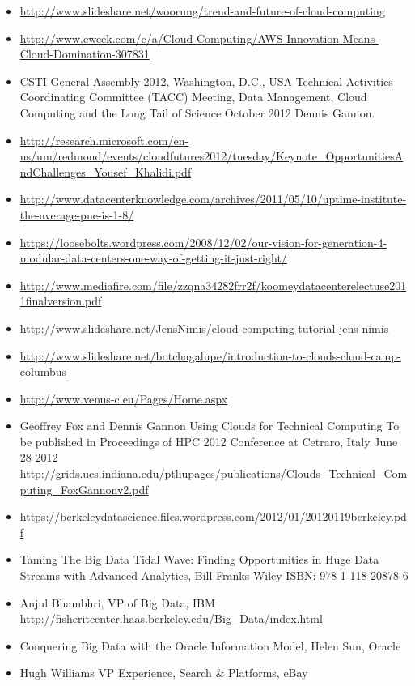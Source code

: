 \begin{itemize}
\tightlist
\item
  \url{http://www.slideshare.net/woorung/trend-and-future-of-cloud-computing}
\item
  \url{http://www.eweek.com/c/a/Cloud-Computing/AWS-Innovation-Means-Cloud-Domination-307831}
\item
  CSTI General Assembly 2012, Washington, D.C., USA Technical Activities
  Coordinating Committee (TACC) Meeting, Data Management, Cloud
  Computing and the Long Tail of Science October 2012 Dennis Gannon.
\item
  \url{http://research.microsoft.com/en-us/um/redmond/events/cloudfutures2012/tuesday/Keynote_OpportunitiesAndChallenges_Yousef_Khalidi.pdf}
\item
  \url{http://www.datacenterknowledge.com/archives/2011/05/10/uptime-institute-the-average-pue-is-1-8/}
\item
  \url{https://loosebolts.wordpress.com/2008/12/02/our-vision-for-generation-4-modular-data-centers-one-way-of-getting-it-just-right/}
\item
  \url{http://www.mediafire.com/file/zzqna34282frr2f/koomeydatacenterelectuse2011finalversion.pdf}
\item
  \url{http://www.slideshare.net/JensNimis/cloud-computing-tutorial-jens-nimis}
\item
  \url{http://www.slideshare.net/botchagalupe/introduction-to-clouds-cloud-camp-columbus}
\item
  \url{http://www.venus-c.eu/Pages/Home.aspx}
\item
  Geoffrey Fox and Dennis Gannon Using Clouds for Technical Computing To
  be published in Proceedings of HPC 2012 Conference at Cetraro, Italy
  June 28 2012
  \url{http://grids.ucs.indiana.edu/ptliupages/publications/Clouds_Technical_Computing_FoxGannonv2.pdf}
\item
  \url{https://berkeleydatascience.files.wordpress.com/2012/01/20120119berkeley.pdf}
\item
  Taming The Big Data Tidal Wave: Finding Opportunities in Huge Data
  Streams with Advanced Analytics, Bill Franks Wiley ISBN:
  978-1-118-20878-6
\item
  Anjul Bhambhri, VP of Big Data, IBM
  \url{http://fisheritcenter.haas.berkeley.edu/Big_Data/index.html}
\item
  Conquering Big Data with the Oracle Information Model, Helen Sun,
  Oracle
\item
  Hugh Williams VP Experience, Search \& Platforms, eBay

\end{itemize}
